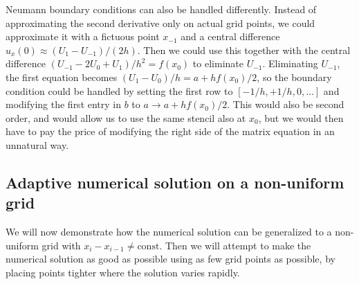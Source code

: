 Neumann boundary conditions can also be handled differently.
Instead of approximating the second derivative only on actual grid points, we could approximate it with a fictuous point $x_{-1}$ and a central difference $u_x(0) \approx (U_1 - U_{-1}) / (2 h)$.
Then we could use this together with the central difference $(U_{-1} - 2 U_0 + U_1) / h^2 = f(x_0)$ to eliminate $U_{-1}$.
Eliminating $U_{-1}$, the first equation becomes $(U_1 - U_0) / h = a + h f(x_0) / 2$, so the boundary condition could be handled by setting the first row to $[-1/h, +1/h, 0, \dots]$ and modifying the first entry in $b$ to $a \rightarrow a + h f(x_0) / 2$.
This would also be second order, and would allow us to use the same stencil also at $x_0$, but we would then have to pay the price of modifying the right side of the matrix equation in an unnatural way.

\subsection{Adaptive numerical solution on a non-uniform grid}

\label{ex1_amr_section}

We will now demonstrate how the numerical solution can be generalized to a non-uniform grid with $x_i - x_{i-1} \neq \text{const}$.
Then we will attempt to make the numerical solution as good as possible using as few grid points as possible, by placing points tighter where the solution varies rapidly.


